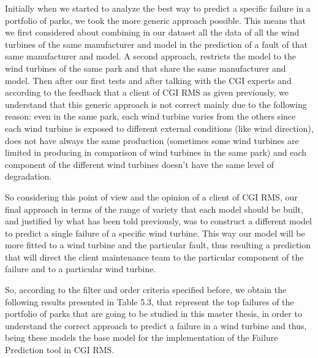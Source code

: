 Initially when we started to analyze the best way to predict a specific failure in a portfolio of parks, we took the more generic approach possible. This means that we first considered about combining in our dataset all the data of all the wind turbines of the same manufacturer and model in the prediction of a fault of that same manufacturer and model. A second approach, restricts the model to the wind turbines of the same park and that share the same manufacturer and model. Then after our first tests and after talking with the CGI experts and according to the feedback that a client of CGI RMS as given previously, we understand that this generic approach is not correct mainly due to the following reason: even in the same park, each wind turbine varies from the others since each wind turbine is exposed to different external conditions (like wind direction), does not have always the same production (sometimes some wind turbines are limited in producing in comparison of wind turbines in the same park) and each component of the different wind turbines doesn't have the same level of degradation. 


So considering this point of view and the opinion of a client of CGI RMS, our final approach in terms of the range of variety that each model should be built, and justified by what has been told previously, was to construct a different model to predict a single failure of a specific wind turbine. This way our model will be more fitted to a wind turbine and the particular fault, thus resulting a prediction that will direct the client maintenance team to the particular component of the failure and to a particular wind turbine.

So, according to the filter and order criteria specified before, we obtain the following results presented in Table 5.3, that represent the top failures of the portfolio of parks that are going to be studied in this master thesis, in order to understand the correct approach to predict a failure in a wind turbine and thus, being these models the base model for the implementation of the Failure Prediction tool in CGI RMS.

